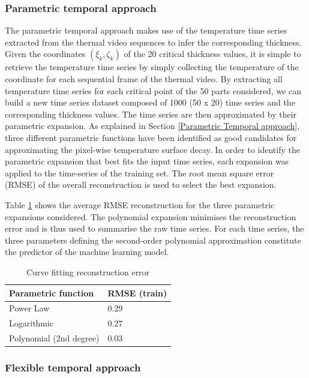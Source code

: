 \subsubsection{Parametric temporal approach}
The parametric temporal approach makes use of the temperature time series extracted from the thermal video sequences to infer the corresponding thickness. Given the coordinates $(\xi_{k}, \zeta_{k})$ of the 20 critical thickness values, it is simple to retrieve the temperature time series by simply collecting the temperature of the coordinate for each sequential frame of the thermal video. By extracting all temperature time series for each critical point of the 50 parts considered, we can build a new time series dataset composed of 1000 (50 x 20) time series and the corresponding thickness values. The time series are then approximated by their parametric expansion. As explained in Section \ref{Parametric Temporal approach}, three different parametric functions have been identified as good candidates for approximating the pixel-wise temperature surface decay. In order to identify the parametric expansion that best fits the input time series, each expansion was applied to the time-series of the training set. The root mean square error (RMSE) of the overall reconstruction is used to select the best expansion. 

Table \ref{tab:curve_fitting_error} shows the average RMSE reconstruction for the three parametric expansions considered. The polynomial expansion minimises the reconstruction error and is thus used to summarise the raw time series.  
For each time series, the three parameters defining the second-order polynomial approximation constitute the predictor of the machine learning model.

\begin{table}
\centering
\caption{Curve fitting reconstruction error}
\begin{tabular}{ll}
\toprule
Parametric function    & RMSE (train) \\ 
\midrule

Power Law              & 0.29         \\ 
Logarithmic            & 0.27         \\ 
Polynomial (2nd degree) & 0.03         \\ 
\bottomrule
\end{tabular}
\label{tab:curve_fitting_error}
\end{table}


\subsubsection{Flexible temporal approach}

